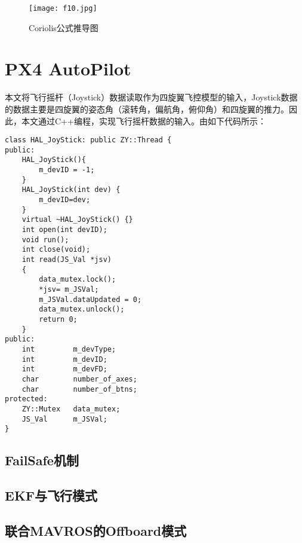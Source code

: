 \begin{figure}[!ht]
\centering
\texttt{[image: f10.jpg]}
\caption{Coriolis公式推导图}
\label{fig9}
\end{figure}



\section{PX4 AutoPilot}
本文将飞行摇杆（Joystick）数据读取作为四旋翼飞控模型的输入，Joystick数据的数据主要是四旋翼的姿态角（滚转角，偏航角，俯仰角）和四旋翼的推力。因此，本文通过C++编程，实现飞行摇杆数据的输入。由如下代码所示：

\begin{lstlisting}[language={[ANSI]C++}]
class HAL_JoyStick: public ZY::Thread {
public:
    HAL_JoyStick(){
        m_devID = -1;
    }
    HAL_JoyStick(int dev) {
        m_devID=dev;
    }
    virtual ~HAL_JoyStick() {}
    int open(int devID);
    void run();
    int close(void);
    int read(JS_Val *jsv)
    {
        data_mutex.lock();
        *jsv= m_JSVal;
        m_JSVal.dataUpdated = 0;
        data_mutex.unlock();
        return 0;
    }
public:
    int         m_devType;
    int         m_devID;
    int         m_devFD;
    char        number_of_axes;
    char        number_of_btns;
protected:
    ZY::Mutex   data_mutex;
    JS_Val      m_JSVal;
}
\end{lstlisting}

\subsection{FailSafe机制} \label{2.2.1}
\subsection{EKF与飞行模式} \label{2.2.2}
\subsection{联合MAVROS的Offboard模式} \label{2.2.3}



